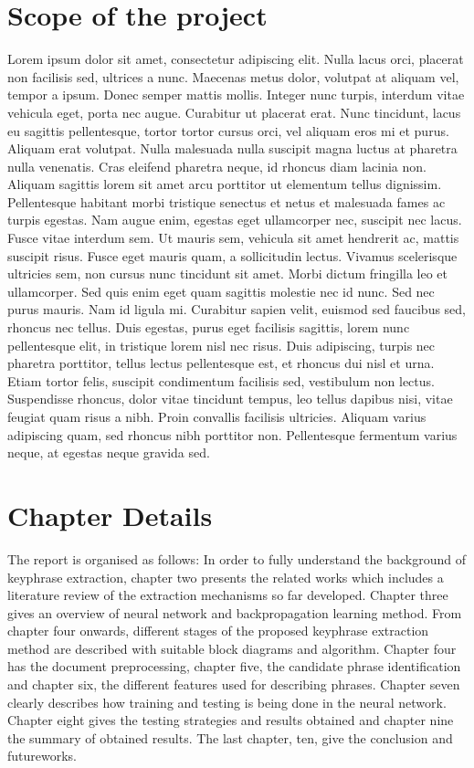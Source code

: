 \documentclass[12pt,a4paper,titlepage]{report}
\begin{document}
\section{Scope of the project}
Lorem ipsum dolor sit amet, consectetur adipiscing elit. Nulla lacus orci, placerat non facilisis sed, ultrices a nunc. Maecenas metus dolor, volutpat at aliquam vel, tempor a ipsum. Donec semper mattis mollis. Integer nunc turpis, interdum vitae vehicula eget, porta nec augue. Curabitur ut placerat erat. Nunc tincidunt, lacus eu sagittis pellentesque, tortor tortor cursus orci, vel aliquam eros mi et purus. Aliquam erat volutpat. Nulla malesuada nulla suscipit magna luctus at pharetra nulla venenatis. Cras eleifend pharetra neque, id rhoncus diam lacinia non. Aliquam sagittis lorem sit amet arcu porttitor ut elementum tellus dignissim. Pellentesque habitant morbi tristique senectus et netus et malesuada fames ac turpis egestas. Nam augue enim, egestas eget ullamcorper nec, suscipit nec lacus. Fusce vitae interdum sem. Ut mauris sem, vehicula sit amet hendrerit ac, mattis suscipit risus. Fusce eget mauris quam, a sollicitudin lectus.
Vivamus scelerisque ultricies sem, non cursus nunc tincidunt sit amet. Morbi dictum fringilla leo et ullamcorper. Sed quis enim eget quam sagittis molestie nec id nunc. Sed nec purus mauris. Nam id ligula mi. Curabitur sapien velit, euismod sed faucibus sed, rhoncus nec tellus. Duis egestas, purus eget facilisis sagittis, lorem nunc pellentesque elit, in tristique lorem nisl nec risus. Duis adipiscing, turpis nec pharetra porttitor, tellus lectus pellentesque est, et rhoncus dui nisl et urna. Etiam tortor felis, suscipit condimentum facilisis sed, vestibulum non lectus. Suspendisse rhoncus, dolor vitae tincidunt tempus, leo tellus dapibus nisi, vitae feugiat quam risus a nibh. Proin convallis facilisis ultricies. Aliquam varius adipiscing quam, sed rhoncus nibh porttitor non. Pellentesque fermentum varius neque, at egestas neque gravida sed.

\section{Chapter Details}
The report is organised as follows: In order to fully understand the background of keyphrase extraction, chapter two presents the related works which includes a literature review of the extraction mechanisms so far developed. Chapter three gives an overview of neural network and backpropagation learning method. From chapter four onwards, different stages of the proposed keyphrase extraction method are described with suitable block diagrams and algorithm. Chapter four has the document preprocessing, chapter five, the candidate phrase identification and chapter six, the different features used for describing phrases. Chapter seven clearly describes how training and testing is being done in the neural network. Chapter eight gives the testing strategies and results obtained and chapter nine the summary of obtained results. The last chapter, ten, give the conclusion and futureworks.
\end{document}
